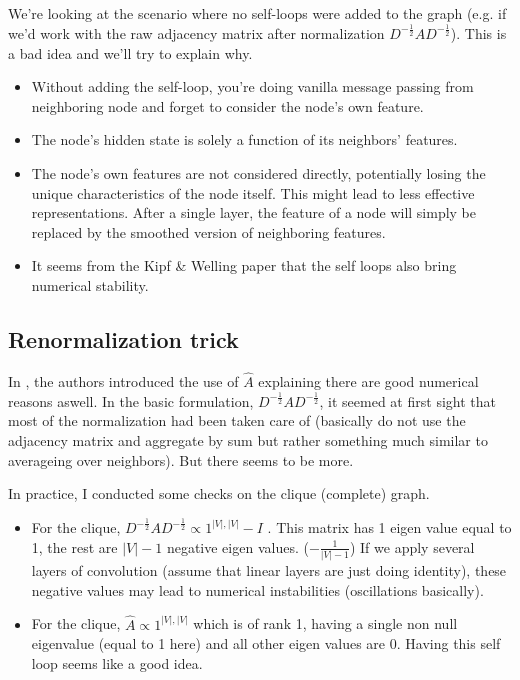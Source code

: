 \documentclass[a4paper]{article}
\begin{document}
We're looking at the scenario where no self-loops were added to the graph (e.g. if we'd work with the raw adjacency matrix after normalization
$D^{-\frac{1}{2}} A D^{-\frac{1}{2}}$). This is a bad idea and we'll try to explain why.
\begin{itemize}
    \item Without adding the self-loop, you're doing vanilla message passing from neighboring node and forget to consider the node's own feature.
    \item The node's hidden state is solely a function of its neighbors' features.
    \item The node's own features are not considered directly, potentially losing the unique characteristics of the node itself. 
    This might lead to less effective representations.  After a single layer, the feature of a node will simply 
    be replaced by the smoothed version of neighboring features.
    \item It seems from the Kipf \& Welling paper \cite{kipf2017semisupervised} that the self loops also bring numerical stability.
\end{itemize}
\subsection*{Renormalization trick}
In \cite{kipf2017semisupervised}, the authors introduced the use of $\hat{A}$ explaining there are good numerical 
reasons aswell. In the basic formulation, $D^{-\frac{1}{2}} A D^{-\frac{1}{2}}$, it seemed at first sight that most of the normalization had been taken
care of (basically do not use the adjacency matrix and aggregate by sum but rather something much similar to averageing over neighbors). But there seems to be more.

In practice, I conducted some checks on the clique (complete) graph.
\begin{itemize}
    \item For the clique, $D^{-\frac{1}{2}} A D^{-\frac{1}{2}} \propto 1^{|V|, |V|} - I$ . 
        \subitem This matrix has 1 eigen value equal to 1, the rest are $|V|-1$ negative eigen values. ($-\frac{1}{|V|-1}$)
        \subitem If we apply several layers of convolution (assume that linear layers are just doing identity), these negative values may lead 
        to numerical instabilities (oscillations basically).
    \item For the clique, $\hat{A} \propto 1^{|V|, |V|}$ which is of rank 1, having a single non null eigenvalue (equal to 1 here) and all other eigen values are 0. Having this self loop seems like a good idea.
\end{itemize}
\end{document}
